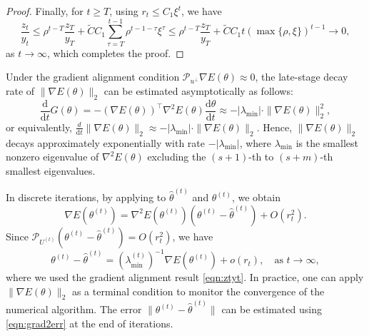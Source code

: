 \documentclass[final]{siamart251216}
\begin{document}
\begin{proof}
Finally, for $t\geqslant T$, using $r_t \leqslant C_1\xi^t$, we have 
\begin{equation}\label{eqn:ztyt}
\frac{z_t}{y_t} \leqslant 
\rho^{t-T} \frac{z_T}{y_T} + 
\tilde{C} C_1
\sum_{\tau=T}^{t-1}\rho^{t-1-\tau} \xi^\tau
\leqslant \rho^{t-T} \frac{z_T}{y_T} + \tilde C C_1 t
\left(\max\{\rho,\xi\}\right)^{t-1}\to 0,
\end{equation}
as $t\to\infty$, which completes the proof.
\end{proof}


\begin{remark}
Under the gradient alignment condition $\mathcal{P}_{u^\perp}\nabla E(\theta) \approx 0$, the late-stage decay rate of $\|\nabla E(\theta)\|_2$ can be estimated asymptotically as follows:
\begin{equation*}
\frac{\mathrm{d}}{\mathrm{d}t}G(\theta)
=-(\nabla E(\theta))^{\top}\nabla^{2}E(\theta)\frac{\mathrm{d}\theta}{\mathrm{d}t}
\approx
-|\lambda_{\min}|\cdot \|\nabla E(\theta)\|_2^2,
\end{equation*}
or equivalently,
$\frac{d}{\mathrm{d}t}
\|\nabla E(\theta)\|_2 \approx 
-|\lambda_{\min}| \cdot \|\nabla E(\theta)\|_2$.
Hence, $\|\nabla E(\theta)\|_2$ decays approximately exponentially with rate $-|\lambda_{\min}|$, where $\lambda_{\min}$ is the smallest nonzero eigenvalue of $\nabla^2 E(\theta)$ excluding the $(s+1)$-th to $(s+m)$-th smallest eigenvalues.


In discrete iterations, by applying  to $\hat{\theta}^{(t)}$ and $\theta^{(t)}$, we obtain
\begin{equation}
\nabla E(\theta^{(t)})=
\nabla^{2}E(\theta^{(t)})
(\theta^{(t)}-\hat{\theta}^{(t)})+O(r_t^2).
\end{equation}
Since $\mathcal{P}_{U^{(t)}}(\theta^{(t)}-\hat{\theta}^{(t)})=O(r_t^2)$, we have
\begin{equation}\label{eqn:grad2err}
\theta^{(t)}-\hat{\theta}^{(t)}
= \left(\lambda_{\min}^{(t)}\right)^{-1} \nabla E(\theta^{(t)})+o(r_t), \quad
\text{as }t\to \infty,
\end{equation}
where we used the gradient alignment result \eqref{eqn:ztyt}.
In practice, one can apply $\|\nabla E(\theta)\|_2$ as a terminal condition to monitor the convergence of the numerical algorithm.
The error $\|\theta^{(t)}-\hat{\theta}^{(t)}\|$ can be estimated using \eqref{eqn:grad2err} at the end of iterations.

\end{remark}
\end{document}
